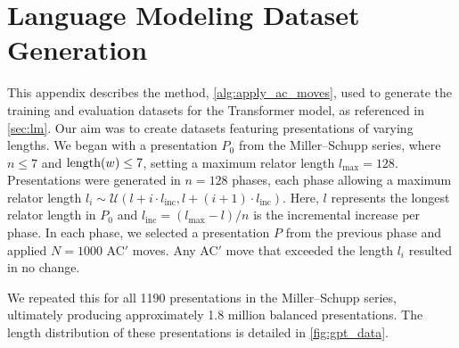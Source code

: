 
\section{Language Modeling Dataset Generation \label{app:algorithm}}

This appendix describes the method, \autoref{alg:apply_ac_moves}, used to generate the training and evaluation datasets for the Transformer model, as referenced in \autoref{sec:lm}. Our aim was to create datasets featuring presentations of varying lengths. We began with a presentation \(P_0\) from the Miller--Schupp series, where $n \leq 7$ and $\operatorname{length}(w) \leq 7$, setting a maximum relator length \(l_{\text{max}} = 128\). Presentations were generated in \(n=128\) phases, each phase allowing a maximum relator length \(l_i \sim \mathcal{U}(l + i \cdot l_{\text{inc}}, l + (i+1) \cdot l_{\text{inc}})\). Here, \(l\) represents the longest relator length in \(P_0\) and \(l_{\text{inc}} = (l_{\text{max}} - l)/n\) is the incremental increase per phase. In each phase, we selected a presentation \(P\) from the previous phase and applied \(N=1000\) AC$'$ moves. Any AC$'$ move that exceeded the length \(l_i\) resulted in no change.

We repeated this for all 1190 presentations in the Miller--Schupp series, ultimately producing approximately 1.8 million balanced presentations. The length distribution of these presentations is detailed in \autoref{fig:gpt_data}.

